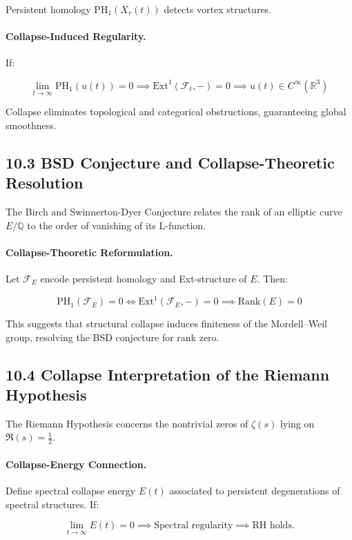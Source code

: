 \documentclass[11pt]{article}
\begin{document}
Persistent homology \( \mathrm{PH}_1(X_r(t)) \) detects vortex structures.

\paragraph{Collapse-Induced Regularity.}
If:

\[
\lim_{t \to \infty} \mathrm{PH}_1(u(t)) = 0 \implies \mathrm{Ext}^1(\mathcal{F}_t, -) = 0 \implies u(t) \in C^\infty(\mathbb{R}^3)
\]

Collapse eliminates topological and categorical obstructions, guaranteeing global smoothness.

\subsection*{10.3 BSD Conjecture and Collapse-Theoretic Resolution}

The Birch and Swinnerton-Dyer Conjecture relates the rank of an elliptic curve \( E/\mathbb{Q} \) to the order of vanishing of its L-function.

\paragraph{Collapse-Theoretic Reformulation.}
Let \( \mathcal{F}_E \) encode persistent homology and Ext-structure of \( E \). Then:

\[
\mathrm{PH}_1(\mathcal{F}_E) = 0 \iff \mathrm{Ext}^1(\mathcal{F}_E, -) = 0 \implies \mathrm{Rank}(E) = 0
\]

This suggests that structural collapse induces finiteness of the Mordell–Weil group, resolving the BSD conjecture for rank zero.

\subsection*{10.4 Collapse Interpretation of the Riemann Hypothesis}

The Riemann Hypothesis concerns the nontrivial zeros of \( \zeta(s) \) lying on \( \Re(s) = \frac{1}{2} \).

\paragraph{Collapse-Energy Connection.}
Define spectral collapse energy \( E(t) \) associated to persistent degenerations of spectral structures. If:

\[
\lim_{t \to \infty} E(t) = 0 \implies \text{Spectral regularity} \implies \text{RH holds}.
\]
\end{document}
